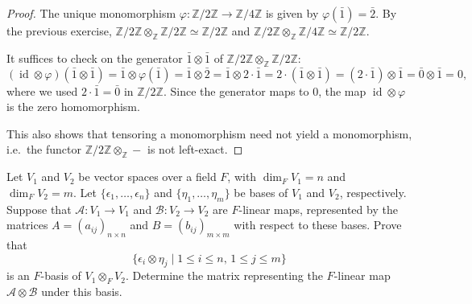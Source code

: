 \begin{proof}
    The unique monomorphism $\varphi:\mathbb{Z}/2\mathbb{Z}\to\mathbb{Z}/4\mathbb{Z}$ is given by $\varphi(\bar 1)=\bar 2$. By the previous exercise, $\mathbb{Z}/2\mathbb{Z}\otimes_\mathbb{Z}\mathbb{Z}/2\mathbb{Z}\simeq\mathbb{Z}/2\mathbb{Z}$ and $\mathbb{Z}/2\mathbb{Z}\otimes_\mathbb{Z}\mathbb{Z}/4\mathbb{Z}\simeq\mathbb{Z}/2\mathbb{Z}$.

    It suffices to check on the generator $\bar 1\otimes\bar 1$ of $\mathbb{Z}/2\mathbb{Z}\otimes_\mathbb{Z}\mathbb{Z}/2\mathbb{Z}$:
    \[
        (\operatorname{id}\otimes\varphi)(\bar 1\otimes\bar 1) = \bar 1\otimes\varphi(\bar 1) = \bar 1\otimes\bar 2 = \bar 1\otimes 2\cdot\bar 1 = 2\cdot(\bar 1\otimes\bar 1) = (2\cdot\bar 1)\otimes\bar 1 = \bar 0\otimes\bar 1 = 0,
    \]
    where we used $2\cdot\bar 1 = \bar 0$ in $\mathbb{Z}/2\mathbb{Z}$. Since the generator maps to $0$, the map $\operatorname{id}\otimes\varphi$ is the zero homomorphism.

    This also shows that tensoring a monomorphism need not yield a monomorphism, i.e.\ the functor $\mathbb{Z}/2\mathbb{Z}\otimes_\mathbb{Z}-$ is not left-exact.
\end{proof}

\begin{exercise}
    Let $V_1$ and $V_2$ be vector spaces over a field $F$, with $\dim_F V_1=n$ and $\dim_F V_2=m$. Let $\{\epsilon_1, \ldots, \epsilon_n\}$ and $\{\eta_1, \ldots, \eta_m\}$ be bases of $V_1$ and $V_2$, respectively. Suppose that $\mathscr{A}\colon V_1 \to V_1$ and $\mathscr{B}\colon V_2 \to V_2$ are $F$-linear maps, represented by the matrices $A=(a_{ij})_{n\times n}$ and $B=(b_{ij})_{m\times m}$ with respect to these bases. Prove that
    \[
        \{\epsilon_i \otimes \eta_j \mid 1 \le i \le n,\, 1 \le j \le m\}
    \]
    is an $F$-basis of $V_1 \otimes_F V_2$. Determine the matrix representing the $F$-linear map $\mathscr{A} \otimes \mathscr{B}$ under this basis.
\end{exercise}

